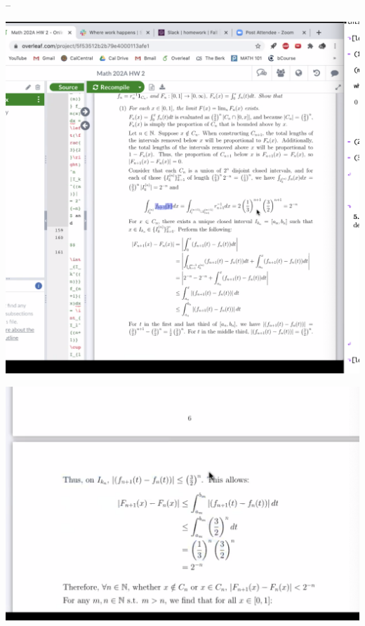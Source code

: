 --\begin{mdframed}
\includegraphics[width=400pt]{img/analysis--berkeley-202a-hw-2dbb.png}
\end{mdframed}

\begin{mdframed}
\includegraphics[width=400pt]{img/analysis--berkeley-202a-hw-6fed.png}
\end{mdframed}
